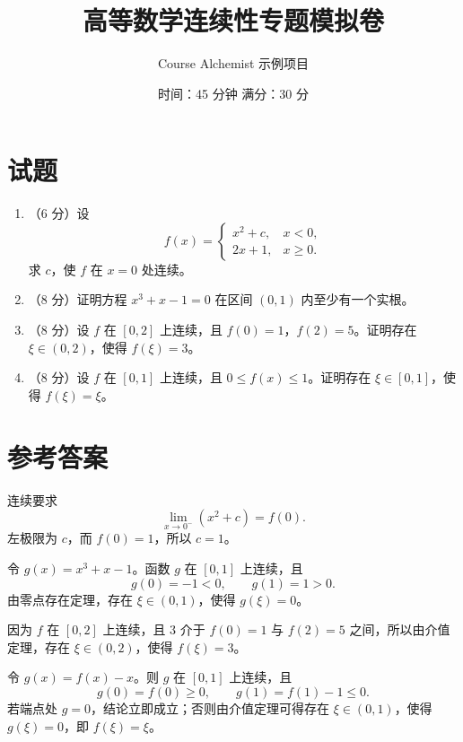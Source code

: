 \documentclass[UTF8,zihao=-4,scheme=chinese]{ctexart}
\title{\bfseries 高等数学连续性专题模拟卷}
\author{Course Alchemist 示例项目}
\date{时间：45 分钟 \qquad 满分：30 分}
\begin{document}
\maketitle

\section*{试题}

\begin{enumerate}
  \item（6 分）设
  \[
    f(x)=
    \begin{cases}
      x^2+c, & x<0,\\
      2x+1, & x\ge 0.
    \end{cases}
  \]
  求 $c$，使 $f$ 在 $x=0$ 处连续。

  \item（8 分）证明方程 $x^3+x-1=0$ 在区间 $(0,1)$ 内至少有一个实根。

  \item（8 分）设 $f$ 在 $[0,2]$ 上连续，且 $f(0)=1$，$f(2)=5$。证明存在 $\xi\in(0,2)$，使得 $f(\xi)=3$。

  \item（8 分）设 $f$ 在 $[0,1]$ 上连续，且 $0\le f(x)\le 1$。证明存在 $\xi\in[0,1]$，使得 $f(\xi)=\xi$。
\end{enumerate}

\section*{参考答案}

\begin{solutionbox}[title={第 1 题}]
连续要求
\[
  \lim_{x\to0^-}(x^2+c)=f(0).
\]
左极限为 $c$，而 $f(0)=1$，所以 $c=1$。
\end{solutionbox}

\begin{solutionbox}[title={第 2 题}]
令 $g(x)=x^3+x-1$。函数 $g$ 在 $[0,1]$ 上连续，且
\[
  g(0)=-1<0,\qquad g(1)=1>0.
\]
由零点存在定理，存在 $\xi\in(0,1)$，使得 $g(\xi)=0$。
\end{solutionbox}

\begin{solutionbox}[title={第 3 题}]
因为 $f$ 在 $[0,2]$ 上连续，且 $3$ 介于 $f(0)=1$ 与 $f(2)=5$ 之间，所以由介值定理，存在 $\xi\in(0,2)$，使得 $f(\xi)=3$。
\end{solutionbox}

\begin{solutionbox}[title={第 4 题}]
令 $g(x)=f(x)-x$。则 $g$ 在 $[0,1]$ 上连续，且
\[
  g(0)=f(0)\ge0,\qquad g(1)=f(1)-1\le0.
\]
若端点处 $g=0$，结论立即成立；否则由介值定理可得存在 $\xi\in(0,1)$，使得 $g(\xi)=0$，即 $f(\xi)=\xi$。
\end{solutionbox}
\end{document}
